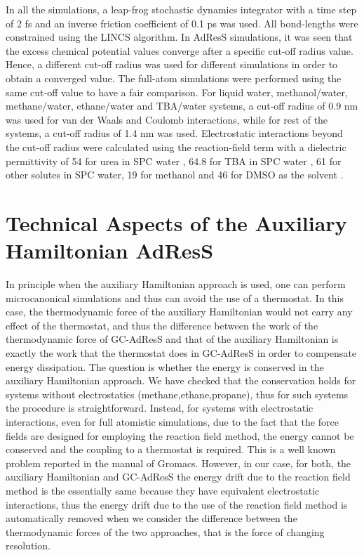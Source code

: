 \documentclass[a4paper,preprint,unsortedaddress]{revtex4-1}
\newcommand{\recheck}[1]{{\color{red} #1}}
\begin{document}
In all the simulations, a leap-frog stochastic dynamics integrator with a time step
of 2 fs and an inverse friction coefficient of 0.1 ps was used. All bond-lengths were constrained using the LINCS 
algorithm. In AdResS simulations, it was 
seen that the excess chemical potential values converge after a specific cut-off radius value. Hence, a different 
cut-off radius was used for different simulations in order to obtain a converged value. The full-atom simulations 
were performed using the same cut-off value to have a fair comparison. For liquid water, methanol/water, methane/water, ethane/water
and TBA/water systems, a cut-off radius of 0.9 nm was used for van der Waals and Coulomb interactions, while for rest 
of the systems, a cut-off radius of 1.4 nm was used. Electrostatic 
interactions beyond the cut-off radius were calculated using the reaction-field term \cite{rf} with a dielectric 
permittivity of 54 for urea in SPC water \cite{urea}, 64.8 for TBA in SPC water \cite{tba}, 61 for other solutes in SPC
water, 19 for methanol and 46 for DMSO as the solvent \cite{vang}.

\section{Technical Aspects of the Auxiliary Hamiltonian AdResS}\label{app:tmp2}
\recheck{In principle when the auxiliary Hamiltonian approach is used,
  one can perform microcanonical simulations and thus can avoid the
  use of a thermostat. In this case, the thermodynamic force of the
  auxiliary Hamiltonian would not carry any effect of the thermostat, and thus the difference between the work of the thermodynamic force of GC-AdResS and that of the auxiliary Hamiltonian is
  exactly the work that the thermostat does in GC-AdResS in order to compensate energy dissipation. The question is whether
  the energy is conserved in the auxiliary Hamiltonian approach. We
  have checked that the conservation holds for systems without
  electrostatics (methane,ethane,propane), thus for such systems the
  procedure is straightforward. Instead, for systems with
  electrostatic interactions, even for full atomistic simulations, due
  to the fact that the force fields are designed for employing the
  reaction field method, the energy cannot be conserved and the
  coupling to a thermostat is required. This is a well known problem
  reported in the manual of Gromacs. However, in our case, for both,
  the auxiliary Hamiltonian and GC-AdResS the energy drift due to the
  reaction field method is the essentially same because they have
  equivalent electrostatic interactions, thus the energy drift due to
  the use of the reaction field method is automatically removed when
  we consider the difference between the thermodynamic forces of the
  two approaches, that is the force of changing resolution.}
\end{document}
